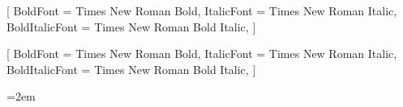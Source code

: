 \usepackage{fontspec}
\setmainfont{Times New Roman}[
  BoldFont = {Times New Roman Bold},
  ItalicFont = {Times New Roman Italic},
  BoldItalicFont = {Times New Roman Bold Italic},
]

\usepackage[main=russian,english]{babel}
[
  BoldFont = {Times New Roman Bold},
  ItalicFont = {Times New Roman Italic},
  BoldItalicFont = {Times New Roman Bold Italic},
]

\usepackage{amsmath,amsfonts,amssymb,amsthm,mathtools}
\usepackage{icomma}

\usepackage[left=3cm,right=1.5cm,top=2cm,bottom=2cm,bindingoffset=0cm]{geometry}
\usepackage{setspace}
\onehalfspacing

\setlength{\parindent}{1.25cm}
\setlength{\parskip}{0pt}
\emergencystretch=2em

\usepackage{enumitem}
\makeatletter
{}
\makeatother

\usepackage{etoolbox}

\usepackage{microtype}

\usepackage{graphicx}
\graphicspath{{images/}}

